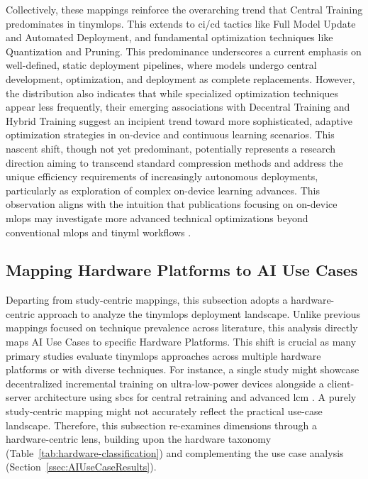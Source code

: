 Collectively, these mappings reinforce the overarching trend that Central Training predominates in \gls{tinymlops}. This extends to \gls{ci}/\gls{cd} tactics like Full Model Update and Automated Deployment, and fundamental optimization techniques like Quantization and Pruning. This predominance underscores a current emphasis on well-defined, static deployment pipelines, where models undergo central development, optimization, and deployment as complete replacements.
However, the distribution also indicates that while specialized optimization techniques appear less frequently, their emerging associations with Decentral Training and Hybrid Training suggest an incipient trend toward more sophisticated, adaptive optimization strategies in on-device and continuous learning scenarios. This nascent shift, though not yet predominant, potentially represents a research direction aiming to transcend standard compression methods and address the unique efficiency requirements of increasingly autonomous deployments, particularly as exploration of complex on-device learning advances. This observation aligns with the intuition that publications focusing on on-device \gls{mlops} may investigate more advanced technical optimizations beyond conventional \gls{mlops} and \gls{tinyml} workflows \cite{pavanTyBoxAutomaticDesign2024}.

\subsection{Mapping Hardware Platforms to AI Use Cases}
\label{ssec:HardwareAIUseCasesResults}

Departing from study-centric mappings, this subsection adopts a hardware-centric approach to analyze the \gls{tinymlops} deployment landscape. Unlike previous mappings focused on technique prevalence across literature, this analysis directly maps AI Use Cases to specific Hardware Platforms. This shift is crucial as many primary studies evaluate \gls{tinymlops} approaches across multiple hardware platforms or with diverse techniques. For instance, a single study might showcase decentralized incremental training on ultra-low-power devices alongside a client-server architecture using \gls{sbc}s for central retraining and advanced \gls{lcm} \cite{antoniniTinyMLOpsFrameworkOrchestrating2022}. A purely study-centric mapping might not accurately reflect the practical use-case landscape. Therefore, this subsection re-examines dimensions through a hardware-centric lens, building upon the hardware taxonomy (Table~\ref{tab:hardware-classification}) and complementing the use case analysis (Section~\ref{ssec:AIUseCaseResults}).

